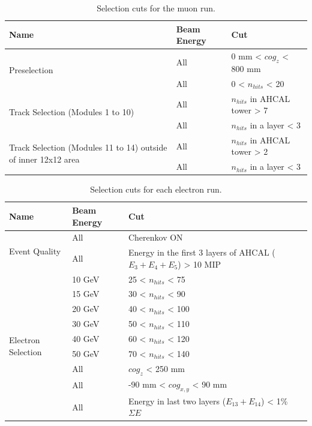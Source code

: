 \documentclass{JINST}
\begin{document}
\begin{table}[htb!]
  \centering
  \caption{Selection cuts for the muon run.}
  \label{table:muon_sel}
  \begin{tabular}{@{}lll@{}}
    \toprule
    \multicolumn{1}{l}{\textbf{Name}} & \textbf{Beam Energy} & \textbf{Cut}\\
    \midrule
    \multirow{2}{*}{Preselection}& All & 0 mm < $cog_{z}$ < 800 mm\\& All & 0 < $n_{hits}$ < 20 \\
    \midrule
    \multirow{2}{*}{Track Selection (Modules 1 to 10)}& All & $n_{hits}$ in AHCAL tower > 7 \\& All & $n_{hits}$ in a layer < 3 \\
    \midrule
    \multirow{2}{*}{Track Selection (Modules 11 to 14) outside of inner 12x12 area}& All & $n_{hits}$ in AHCAL tower > 2 \\& All & $n_{hits}$ in a layer < 3 \\
    \bottomrule
  \end{tabular}
\end{table}

\begin{table}[htb!]
  \centering
  \caption{Selection cuts for each electron run.}
  \label{table:electron_sel}
  \begin{tabular}{@{}lll@{}}
    \toprule
    \multicolumn{1}{l}{\textbf{Name}} & \textbf{Beam Energy} & \textbf{Cut}\\
    \midrule
    \multirow{2}{*}{Event Quality}& All & Cherenkov ON\\& All & Energy in the first 3 layers of AHCAL ($E_3 + E_4 + E_5$) > 10 MIP \\
    \midrule
    \multirow{9}{*}{Electron Selection}& 10 GeV & 25 < $n_{hits}$ < 75 \\& 15 GeV & 30 < $n_{hits}$ < 90 \\& 20 GeV & 40 < $n_{hits}$ < 100 \\& 30 GeV & 50 < $n_{hits}$ < 110 \\& 40 GeV & 60 < $n_{hits}$ < 120 \\& 50 GeV & 70 < $n_{hits}$ < 140 \\& All & $cog_{z}$ < 250 mm\\& All & -90 mm < $cog_{x, y}$ < 90 mm \\& All & Energy in last two layers ($E_{13} + E_{14}$) < 1\% $\Sigma E$ \\
    \bottomrule
  \end{tabular}
\end{table}
\end{document}
